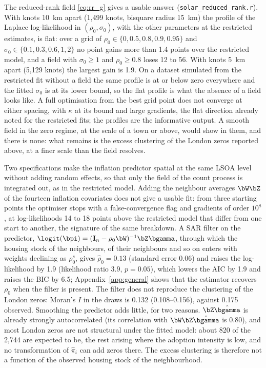 The reduced-rank field \eqref{eq:rr_g} gives a usable answer (\texttt{solar\_reduced\_rank.r}).
With knots 10~km apart (1{,}499 knots, bisquare radius 15~km) the profile of the Laplace log-likelihood in $(\rho_0, \sigma_0)$, with the other parameters at the restricted estimates, is flat: over a grid of $\rho_0 \in \{0, 0.5, 0.8, 0.9, 0.95\}$ and $\sigma_0 \in \{0.1, 0.3, 0.6, 1, 2\}$ no point gains more than 1.4 points over the restricted model, and a field with $\sigma_0 \ge 1$ and $\rho_0 \ge 0.8$ loses 12 to 56.
With knots 5~km apart (5{,}129 knots) the largest gain is 1.9.
On a dataset simulated from the restricted fit without a field the same profile is at or below zero everywhere and the fitted $\sigma_0$ is at its lower bound, so the flat profile is what the absence of a field looks like.
A full optimisation from the best grid point does not converge at either spacing, with $\kappa$ at its bound and large gradients, the flat direction already noted for the restricted fits; the profiles are the informative output.
A smooth field in the zero regime, at the scale of a town or above, would show in them, and there is none: what remains is the excess clustering of the London zeros reported above, at a finer scale than the field resolves.

Two specifications make the inflation predictor spatial at the same LSOA level without adding random effects, so that only the field of the count process is integrated out, as in the restricted model.
Adding the neighbour averages $\bW\bZ$ of the fourteen inflation covariates does not give a usable fit: from three starting points the optimiser stops with a false-convergence flag and gradients of order $10^8$, at log-likelihoods 14 to 18 points above the restricted model that differ from one start to another, the signature of the same breakdown.
A SAR filter on the predictor, $\logit(\bpi) = (\mathbf{I}_n - \rho_0\bW)^{-1}\bZ\bgamma$, through which the housing stock of the neighbours, of their neighbours and so on enters with weights declining as $\rho_0^s$, gives $\hat\rho_0 = 0.13$ (standard error 0.06) and raises the log-likelihood by 1.9 (likelihood ratio 3.9, $p = 0.05$), which lowers the AIC by 1.9 and raises the BIC by 6.5; Appendix~\ref{app:general} shows that the estimator recovers $\rho_0$ when the filter is present.
The filter does not reproduce the clustering of the London zeros: Moran's $I$ in the draws is 0.132 (0.108--0.156), against 0.175 observed.
Smoothing the predictor adds little, for two reasons.
$\bZ\hat\bgamma$ is already strongly autocorrelated (its correlation with $\bW\bZ\hat\bgamma$ is 0.80), and most London zeros are not structural under the fitted model: about 820 of the 2{,}744 are expected to be, the rest arising where the adoption intensity is low, and no transformation of $\hat\pi_i$ can add zeros there.
The excess clustering is therefore not a function of the observed housing stock of the neighbourhood.

